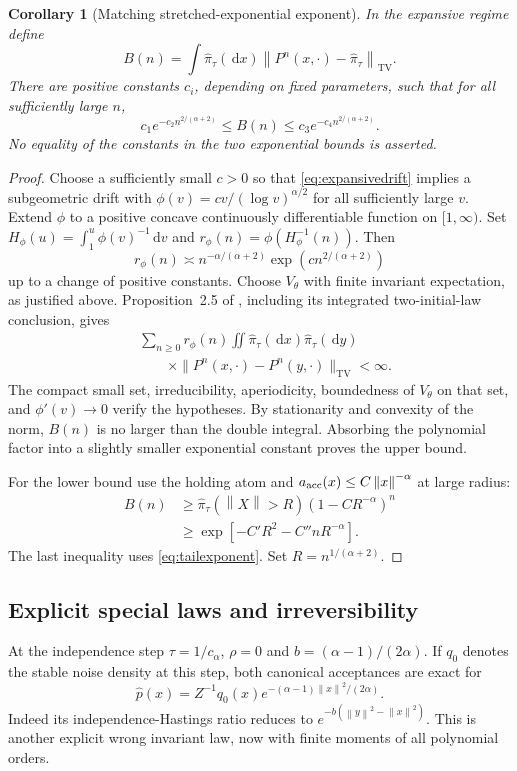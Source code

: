 \documentclass[pdflatex,iicol,sn-mathphys-ay]{sn-jnl}
\newtheorem{corollary}[theorem]{Corollary}
\theoremstyle{definition}\newtheorem{definition}[theorem]{Definition}
\theoremstyle{remark}\newtheorem{remark}[theorem]{Remark}
\numberwithin{equation}{section}
\newcommand{\norm}[1]{\left\lVert#1\right\rVert}\newcommand{\TV}{\mathrm{TV}}
\newcommand{\dd}{\,\mathrm d}\newcommand{\cA}{c_\alpha}\newcommand{\sg}{\operatorname{sigmoid}}
\newcommand{\1}{\mathbf 1}
\begin{document}
\begin{corollary}[Matching stretched-exponential exponent]\label{cor:stretch}
In the expansive regime define
\[
B(n)=\int\widehat\pi_\tau(\dd x)\norm{P^n(x,\cdot)-\widehat\pi_\tau}_{\TV}.
\]
There are positive constants $c_i$, depending on fixed parameters, such that for all sufficiently large $n$,
\begin{equation}
c_1e^{-c_2n^{2/(\alpha+2)}}\le B(n)\le c_3e^{-c_4n^{2/(\alpha+2)}}.\label{eq:stretch}
\end{equation}
No equality of the constants in the two exponential bounds is asserted.
\end{corollary}
\begin{proof}
Choose a sufficiently small $c>0$ so that \eqref{eq:expansivedrift} implies a subgeometric drift with $\phi(v)=cv/(\log v)^{\alpha/2}$ for all sufficiently large $v$. Extend $\phi$ to a positive concave continuously differentiable function on $[1,\infty)$. Set $H_\phi(u)=\int_1^u\phi(v)^{-1}\dd v$ and $r_\phi(n)=\phi(H_\phi^{-1}(n))$. Then
\[
r_\phi(n)\asymp n^{-\alpha/(\alpha+2)}\exp(c n^{2/(\alpha+2)})
\]
up to a change of positive constants. Choose $V_\theta$ with finite invariant expectation, as justified above. Proposition~2.5 of \citet{douc}, including its integrated two-initial-law conclusion, gives
\[
\begin{aligned}
&\sum_{n\ge0}r_\phi(n)\iint\widehat\pi_\tau(\dd x)\widehat\pi_\tau(\dd y)\\
&\qquad\times\|P^n(x,\cdot)-P^n(y,\cdot)\|_{\TV}<\infty.
\end{aligned}
\]
The compact small set, irreducibility, aperiodicity, boundedness of $V_\theta$ on that set, and $\phi'(v)\to0$ verify the hypotheses. By stationarity and convexity of the norm, $B(n)$ is no larger than the double integral. Absorbing the polynomial factor into a slightly smaller exponential constant proves the upper bound.

For the lower bound use the holding atom and $a_{\rm acc}(x)\le C\norm x^{-\alpha}$ at large radius:
\[
\begin{aligned}
B(n)&\ge\widehat\pi_\tau(\norm X>R)(1-CR^{-\alpha})^n\\
&\ge\exp[-C'R^2-C''nR^{-\alpha}].
\end{aligned}
\]
The last inequality uses \eqref{eq:tailexponent}. Set $R=n^{1/(\alpha+2)}$.
\end{proof}

\subsection{Explicit special laws and irreversibility}
At the independence step $\tau=1/\cA$, $\rho=0$ and $b=(\alpha-1)/(2\alpha)$. If $q_0$ denotes the stable noise density at this step, both canonical acceptances are exact for
\begin{equation}
\widehat p(x)=Z^{-1}q_0(x)e^{-(\alpha-1)\norm x^2/(2\alpha)}.\label{eq:tiltedstable}
\end{equation}
Indeed its independence-Hastings ratio reduces to $e^{-b(\norm y^2-\norm x^2)}$. This is another explicit wrong invariant law, now with finite moments of all polynomial orders.
\end{document}
